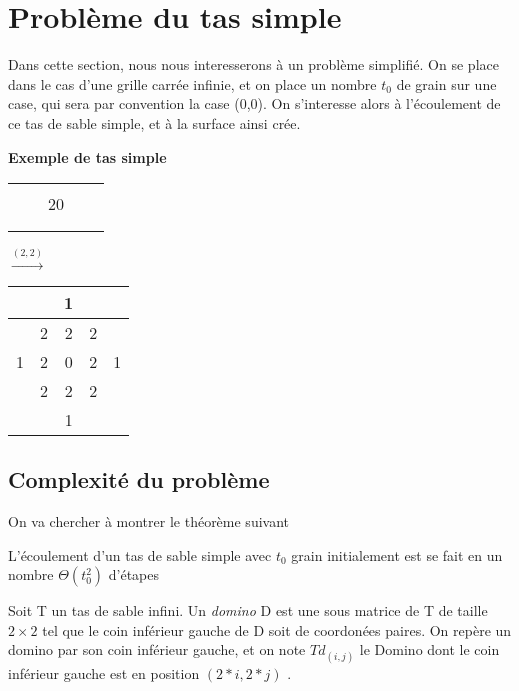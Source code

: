 \section{Problème du tas simple}

Dans cette section, nous nous interesserons à un problème simplifié. On se place dans le cas d'une grille carrée infinie, et on place un nombre $t_0$ de grain sur une case, qui sera par convention la case (0,0). On s'interesse alors  à l'écoulement de ce tas de sable simple, et à la surface ainsi crée. 

\textbf{Exemple de tas simple}
\begin{center}
\begin{tabular}{|c|c|c|c|c|}
\hline
& & & & \\
\hline
& & & & \\
\hline
& & 20& & \\
\hline
& & & & \\
\hline
& & & & \\
\hline
\end{tabular}
\quad
$\xrightarrow{(2,2)}$
\quad
\begin{tabular}{|c|c|c|c|c|}
\hline
& &1 & & \\
\hline
&2 &2 & 2& \\
\hline
1& 2& 0& 2&1 \\
\hline
& 2& 2&2 & \\
\hline
& & 1& & \\
\hline
\end{tabular}
\end{center}

\subsection{Complexité du problème}

On va chercher à montrer le théorème suivant

\begin{theo}
L'écoulement d'un tas de sable simple avec $t_0$ grain initialement est se fait en un nombre $\Theta(t_0^2)$ d'étapes
\end{theo}


\begin{definition}
Soit T un tas de sable infini. Un \textit{domino} D est une sous matrice de T de taille $ 2\times 2$ tel que le coin inférieur gauche de D soit de coordonées paires. On repère un domino par son coin inférieur gauche, et on note $Td_{(i,j)}$ le Domino dont le coin inférieur gauche est en position $(2*i,2*j)$   .   
\end{definition}

